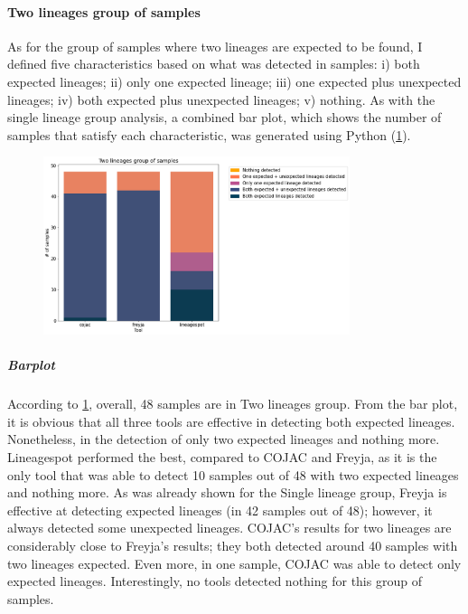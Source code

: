                 
            \paragraph{Two lineages group of samples}
            As for the group of samples where two lineages are expected to be found, I defined five characteristics based on what was detected in samples: i) both expected lineages; ii) only one expected lineage; iii) one expected plus unexpected lineages; iv) both expected plus unexpected lineages; v) nothing. As with the single lineage group analysis, a combined bar plot, which shows the number of samples that satisfy each characteristic, was generated using Python (\cref{fig:results:mock:bar-twolin}). 
            \begin{figure}[ht!]
                \centering
                \includegraphics[width=0.8\textwidth]{figures/results/mock/twolin-num-bars.png}
                \label{fig:results:mock:bar-twolin}
            \end{figure}
                \subparagraph{Barplot}
                According to \cref{fig:results:mock:bar-twolin}, overall, 48 samples are in Two lineages group. From the bar plot, it is obvious that all three tools are effective in detecting both expected lineages. Nonetheless, in the detection of only two expected lineages and nothing more. Lineagespot performed the best, compared to COJAC and Freyja, as it is the only tool that was able to detect 10 samples out of 48 with two expected lineages and nothing more. As was already shown for the Single lineage group, Freyja is effective at detecting expected lineages (in 42 samples out of 48); however, it always detected some unexpected lineages. COJAC's results for two lineages are considerably close to Freyja's results; they both detected around 40 samples with two lineages expected. Even more, in one sample, COJAC was able to detect only expected lineages. Interestingly, no tools detected nothing for this group of samples.


